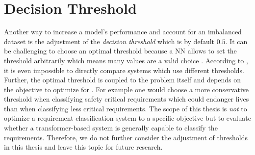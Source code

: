 \section{Decision Threshold}
\label{chp:future_work:sec:decision_threshold}
Another way to increase a model's performance and account for an imbalanced dataset is the adjustment of the \textit{decision threshold} which is by default $0.5$.
It can be challenging to choose an optimal threshold because a \ac{NN} allows to set the threshold arbitrarily which means many values are a valid choice \parencite{Mazurowski:2008}.
According to \textcite{Mazurowski:2008}, it is even impossible to directly compare systems which use different thresholds.
Further, the optimal threshold is coupled to the problem itself and depends on the objective to optimize for \parencite{Brown:2019}.
For example one would choose a more conservative threshold when classifying safety critical requirements which could endanger lives than when classifying less critical requirements.
The scope of this thesis is \textit{not} to optimize a requirement classification system to a specific objective but to evaluate whether a transformer-based system is generally capable to classify the requirements.
Therefore, we do not further consider the adjustment of thresholds in this thesis and leave this topic for future research.
